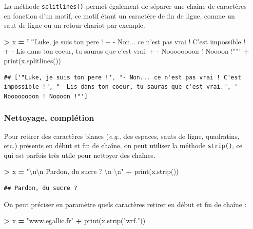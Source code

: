 \documentclass[12pt,]{book}
\newenvironment{Shaded}{\begin{snugshade}}{\end{snugshade}}
\newcommand{\CharTok}[1]{\textcolor[rgb]{0.31,0.60,0.02}{#1}}
\newcommand{\StringTok}[1]{\textcolor[rgb]{0.31,0.60,0.02}{#1}}
\newcommand{\OperatorTok}[1]{\textcolor[rgb]{0.81,0.36,0.00}{\textbf{#1}}}
\newcommand{\BuiltInTok}[1]{#1}
\newcommand{\NormalTok}[1]{#1}
\numberwithin{equation}{section}
\numberwithin{countremarque}{section}
\begin{document}
La méthode \texttt{splitlines()} permet également de séparer une chaîne
de caractères en fonction d'un motif, ce motif étant un caractère de fin
de ligne, comme un saut de ligne ou un retour chariot par exemple.

\begin{Shaded}
\begin{Highlighting}[]
\OperatorTok{>}\NormalTok{ x }\OperatorTok{=} \StringTok{'''"Luke, je suis ton pere !}
\StringTok{+ - Non... ce n'est pas vrai ! C'est impossible !}
\StringTok{+ - Lis dans ton coeur, tu sauras que c'est vrai.}
\StringTok{+ - Noooooooon ! Noooon !"'''}
\OperatorTok{+} \BuiltInTok{print}\NormalTok{(x.splitlines())}
\end{Highlighting}
\end{Shaded}

\begin{lstlisting}
## ['"Luke, je suis ton pere !', "- Non... ce n'est pas vrai ! C'est impossible !", "- Lis dans ton coeur, tu sauras que c'est vrai.", '- Noooooooon ! Noooon !"']
\end{lstlisting}

\subsubsection{Nettoyage, complétion}\label{nettoyage-completion}

Pour retirer des caractères blancs (\emph{e.g.}, des espaces, sauts de
ligne, quadratins, etc.) présents en début et fin de chaîne, on peut
utiliser la méthode \texttt{strip()}, ce qui est parfois très utile pour
nettoyer des chaînes.

\begin{Shaded}
\begin{Highlighting}[]
\OperatorTok{>}\NormalTok{ x }\OperatorTok{=} \StringTok{"}\CharTok{\textbackslash{}n\textbackslash{}n}\StringTok{    Pardon, du sucre ?     }\CharTok{\textbackslash{}n}\StringTok{  }\CharTok{\textbackslash{}n}\StringTok{"}
\OperatorTok{+} \BuiltInTok{print}\NormalTok{(x.strip())}
\end{Highlighting}
\end{Shaded}

\begin{lstlisting}
## Pardon, du sucre ?
\end{lstlisting}

On peut préciser en paramètre quels caractères retirer en début et fin
de chaîne :

\begin{Shaded}
\begin{Highlighting}[]
\OperatorTok{>}\NormalTok{ x }\OperatorTok{=} \StringTok{"www.egallic.fr"}
\OperatorTok{+} \BuiltInTok{print}\NormalTok{(x.strip(}\StringTok{"wrf."}\NormalTok{))}
\end{Highlighting}
\end{Shaded}
\end{document}
